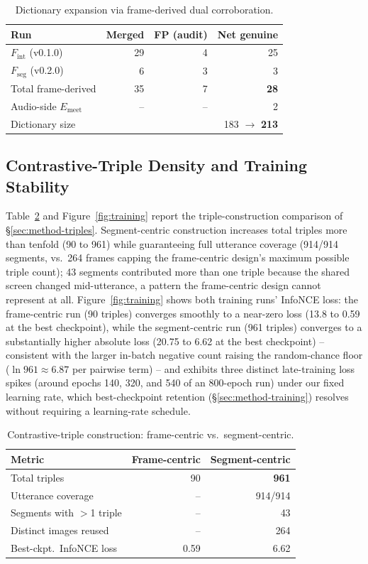 ﻿\documentclass[twocolumn]{article}
\begin{document}
\begin{table}[t]
\centering
\caption{Dictionary expansion via frame-derived dual corroboration.}
\label{tab:dictexpand}
\scriptsize
\begin{tabular}{lrrr}
\toprule
Run & Merged & FP (audit) & Net genuine \\
\midrule
$F_{\text{int}}$ (v0.1.0) & 29 & 4 & 25 \\
$F_{\text{seg}}$ (v0.2.0) & 6 & 3 & 3 \\
\midrule
Total frame-derived & 35 & 7 & \textbf{28} \\
Audio-side $E_{\text{meet}}$ & -- & -- & 2 \\
\midrule
Dictionary size & \multicolumn{3}{r}{183 $\rightarrow$ \textbf{213}} \\
\bottomrule
\end{tabular}
\end{table}

\subsection{Contrastive-Triple Density and Training Stability}

Table~\ref{tab:triples} and Figure~\ref{fig:training} report the triple-construction comparison of
\S\ref{sec:method-triples}. Segment-centric construction increases total triples more than tenfold
(90 to 961) while guaranteeing full utterance coverage (914/914 segments, vs.\ 264 frames capping
the frame-centric design's maximum possible triple count); 43 segments contributed more than one
triple because the shared screen changed mid-utterance, a pattern the frame-centric design cannot
represent at all. Figure~\ref{fig:training} shows both training runs' InfoNCE loss: the frame-centric
run (90 triples) converges smoothly to a near-zero loss (13.8 to 0.59 at the best checkpoint),
while the segment-centric run (961 triples) converges to a substantially higher absolute loss (20.75
to 6.62 at the best checkpoint) -- consistent with the larger in-batch negative count raising the
random-chance floor ($\ln 961 \approx 6.87$ per pairwise term) -- and exhibits three distinct
late-training loss spikes (around epochs 140, 320, and 540 of an 800-epoch run) under our fixed
learning rate, which best-checkpoint retention (\S\ref{sec:method-training}) resolves without
requiring a learning-rate schedule.

\begin{table}[t]
\centering
\caption{Contrastive-triple construction: frame-centric vs.\ segment-centric.}
\label{tab:triples}
\scriptsize
\begin{tabular}{lrr}
\toprule
Metric & Frame-centric & Segment-centric \\
\midrule
Total triples & 90 & \textbf{961} \\
Utterance coverage & -- & 914/914 \\
Segments with $>$1 triple & -- & 43 \\
Distinct images reused & -- & 264 \\
Best-ckpt.\ InfoNCE loss & 0.59 & 6.62 \\
\bottomrule
\end{tabular}
\end{table}
\end{document}
